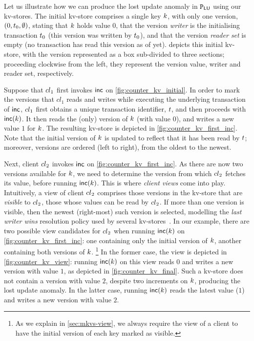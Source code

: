 Let us illustrate how we can produce the lost update anomaly in $\mathtt{P}_{\mathsf{LU}}$ using our kv-stores. 
The initial kv-store comprises a single key $k$, with only one 
version, $(0, t_{0}, \emptyset)$, stating that $k$ holds value $0$, 
that the version \emph{writer} is the initialising transaction $t_0$ (this version was written by $t_0$), 
and that the version \emph{reader set} is empty (no transaction has read this version as of yet). 
 depicts this initial kv-store, with the version
represented as a box sub-divided to three sections;
proceeding clockwise from the left, they represent the version value, writer and reader set, respectively.

Suppose that ${cl}_1$ first invokes $\mathsf{inc}$ on \cref{fig:counter_kv_initial}. 
In order to mark the versions that $cl_1$ reads and writes while executing the underlying transaction of $\mathsf{inc}$,  
${cl}_1$ first obtains a unique transaction identifier, $t$, 
and then proceeds with $\mathsf{inc}(k)$. 
It then reads the (only) version of $k$ (with value $0$), 
and writes a new value $1$ for $k$. 
The resulting kv-store is depicted in \cref{fig:counter_kv_first_inc}.
Note that the initial version of $k$ is updated to reflect that it has been read by $t$; 
moreover, versions are ordered (left to right), from the oldest to the newest.

Next, client ${cl}_2$ invokes $\mathsf{inc}$ on \cref{fig:counter_kv_first_inc}. 
As there are now two versions available for $k$, 
we need to determine the version from which ${cl}_2$ fetches its value, before running $\mathsf{inc}(k)$.
This is where \emph{client views} come into play.
Intuitively, a view of client ${cl}_2$ comprises those versions in the kv-store that are \emph{visible} to ${cl}_2$, 
\ie those whose values can be read by ${cl}_2$. 
If more than one version is visible, then the newest (right-most) such version is selected, 
modelling the \emph{last writer wins} resolution policy used by several kv-stores~\cite{vogels:2009:ec:1435417.1435432}. 
In our example, there are two possible view candidates for ${cl}_2$ when running $\mathsf{inc}(k)$ on \cref{fig:counter_kv_first_inc}: 
one containing only the initial version of $k$, 
another containing both versions of $k$.%
\footnote{
As we explain in \cref{sec:mkvs-view}, we always require the view of a client 
to have the initial version of each key marked as visible.}
In the former case, the view is depicted in \cref{fig:counter_kv_view}:
running $\mathsf{inc}(k)$ on this view reads $0$ and writes a new version with value $1$, as depicted in \cref{fig:counter_kv_final}.
Such a kv-store does not contain a version with value $2$, despite two increments on $k$, producing the lost update anomaly.
In the latter case, running $\mathsf{inc}(k)$ reads the latest value ($1$) and writes a new version with value $2$.

